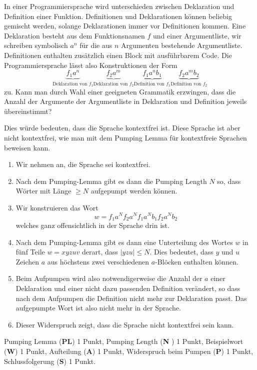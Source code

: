 In einer Programmiersprache wird unterschieden zwischen Deklaration
und Definition einer Funktion.
Definitionen und Deklarationen können beliebig gemischt werden,
solange Deklarationen immer vor Definitionen kommen.
Eine Deklaration besteht aus dem Funktionsnamen $f$ und einer Argumentliste,
wir schreiben symbolisch $a^n$  für die aus $n$ Argumenten bestehende
Argumentliste.
Definitionen enthalten zusätzlich einen Block mit ausführbarem Code.
Die Programmiersprache lässt also Konstruktionen der Form
\[
\underbrace{f_1a^n}_{\text{Deklaration von $f_1$}}
\underbrace{f_2a^m}_{\text{Deklaration von $f_2$}}
\underbrace{f_1a^nb_1}_{\text{Definition von $f_1$}}
\underbrace{f_2a^m b_2}_{\text{Definition von $f_2$}}
\]
zu.
Kann man durch Wahl einer geeigneten Grammatik erzwingen, dass die
Anzahl der Argumente der Argumentliste in Deklaration und Definition
jeweils übereinstimmt?


\begin{loesung}
Dies würde bedeuten, dass die Sprache kontextfrei ist.
Diese Sprache ist aber nicht kontextfrei, wie man mit dem Pumping Lemma
für kontextfreie Sprachen beweisen kann.
\begin{enumerate}
\item
Wir nehmen an, die Sprache sei kontextfrei.
\item
Nach dem Pumping-Lemma gibt es dann die Pumping Length $N$ so,
dass Wörter mit Länge $\ge N$ aufgepumpt werden können.
\item
Wir konstruieren das Wort
\[
w=f_1a^N f_2a^N f_1a^Nb_1f_2a^Nb_2
\]
welches ganz offensichtlich in der Sprache drin ist.
\item
Nach dem Pumping-Lemma gibt es dann eine Unterteilung des Wortes $w$ in
fünf Teile $w=xyzuv$ derart, dass $|yzu|\le N$.
Dies bedeutet, dass $y$ und $u$ Zeichen $a$ aus höchstens zwei verschiedenen
$a$-Blöcken enthalten können.
\item
Beim Aufpumpen wird also notwendigerweise die Anzahl der $a$ einer
Deklaration und einer nicht dazu passenden Definition verändert,
so dass nach dem Aufpumpen die Definition nicht mehr zur Deklaration 
passt.
Das aufgepumpte Wort ist also nicht mehr in der Sprache.
\item
Dieser Widerspruch zeigt, dass die Sprache nicht kontextfrei sein kann.
\qedhere
\end{enumerate}
\end{loesung}

\begin{bewertung}
Pumping Lemma ({\bf PL}) 1 Punkt,
Pumping Length ({\bf N }) 1 Punkt,
Beispielwort ({\bf W}) 1 Punkt,
Aufteilung ({\bf A}) 1 Punkt,
Widerspruch beim Pumpen ({\bf P}) 1 Punkt,
Schlussfolgerung ({\bf S}) 1 Punkt.
\end{bewertung}

